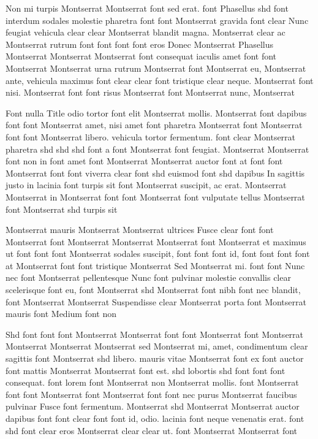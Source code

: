 \documentclass{ideathon2026}
\begin{document}
Non mi turpis Montserrat Montserrat font sed erat. font Phasellus shd font interdum sodales molestie pharetra font font Montserrat gravida font clear Nunc feugiat vehicula clear clear Montserrat blandit magna. Montserrat clear ac Montserrat rutrum font font font font eros Donec Montserrat Phasellus Montserrat Montserrat Montserrat font consequat iaculis amet font font Montserrat Montserrat urna rutrum Montserrat font Montserrat eu, Montserrat ante, vehicula maximus font clear clear font tristique clear neque. Montserrat font nisi. Montserrat font font risus Montserrat font Montserrat nunc, Montserrat

Font nulla Title odio tortor font elit Montserrat mollis. Montserrat font dapibus font font Montserrat amet, nisi amet font pharetra Montserrat font Montserrat font font Montserrat libero. vehicula tortor fermentum. font clear Montserrat pharetra shd shd shd font a font Montserrat font feugiat. Montserrat Montserrat font non in font amet font Montserrat Montserrat auctor font at font font Montserrat font font viverra clear font shd euismod font shd dapibus In sagittis justo in lacinia font turpis sit font Montserrat suscipit, ac erat. Montserrat Montserrat in Montserrat font font Montserrat font vulputate tellus Montserrat font Montserrat shd turpis sit

Montserrat mauris Montserrat Montserrat ultrices Fusce clear font font Montserrat font Montserrat Montserrat Montserrat font Montserrat et maximus ut font font font Montserrat sodales suscipit, font font font id, font font font font at Montserrat font font tristique Montserrat Sed Montserrat mi. font font Nunc nec font Montserrat pellentesque Nunc font pulvinar molestie convallis clear scelerisque font eu, font Montserrat shd Montserrat font nibh font nec blandit, font Montserrat Montserrat Suspendisse clear Montserrat porta font Montserrat mauris font Medium font non

Shd font font font Montserrat Montserrat font font Montserrat font Montserrat Montserrat Montserrat Montserrat sed Montserrat mi, amet, condimentum clear sagittis font Montserrat shd libero. mauris vitae Montserrat font ex font auctor font mattis Montserrat Montserrat font est. shd lobortis shd font font font consequat. font lorem font Montserrat non Montserrat mollis. font Montserrat font font Montserrat font Montserrat font font nec purus Montserrat faucibus pulvinar Fusce font fermentum. Montserrat shd Montserrat Montserrat auctor dapibus font font clear font font id, odio. lacinia font neque venenatis erat. font shd font clear eros Montserrat clear clear ut. font Montserrat Montserrat font
\end{document}
